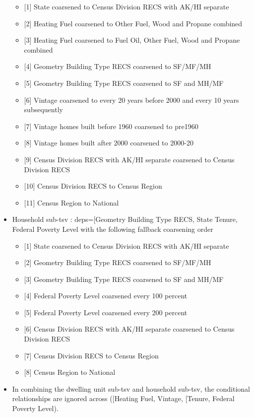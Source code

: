 \begin{itemize}
\begin{itemize}
  \item
    {[}1{]} State coarsened to Census Division RECS with AK/HI separate
  \item
    {[}2{]} Heating Fuel coarsened to Other Fuel, Wood and Propane
    combined
  \item
    {[}3{]} Heating Fuel coarsened to Fuel Oil, Other Fuel, Wood and
    Propane combined
  \item
    {[}4{]} Geometry Building Type RECS coarsened to SF/MF/MH
  \item
    {[}5{]} Geometry Building Type RECS coarsened to SF and MH/MF
  \item
    {[}6{]} Vintage coarsened to every 20 years before 2000 and every 10
    years subsequently
  \item
    {[}7{]} Vintage homes built before 1960 coarsened to pre1960
  \item
    {[}8{]} Vintage homes built after 2000 coarsened to 2000-20
  \item
    {[}9{]} Census Division RECS with AK/HI separate coarsened to Census
    Division RECS
  \item
    {[}10{]} Census Division RECS to Census Region
  \item
    {[}11{]} Census Region to National
  \end{itemize}
\item
  Household sub-tsv : deps={[}\textquotesingle Geometry Building Type
  RECS\textquotesingle, \textquotesingle State\textquotesingle{}
  \textquotesingle Tenure\textquotesingle, \textquotesingle Federal
  Poverty Level\textquotesingle{]} with the following fallback
  coarsening order

  \begin{itemize}
   
  \item
    {[}1{]} State coarsened to Census Division RECS with AK/HI separate
  \item
    {[}2{]} Geometry Building Type RECS coarsened to SF/MF/MH
  \item
    {[}3{]} Geometry Building Type RECS coarsened to SF and MH/MF
  \item
    {[}4{]} Federal Poverty Level coarsened every 100 percent
  \item
    {[}5{]} Federal Poverty Level coarsened every 200 percent
  \item
    {[}6{]} Census Division RECS with AK/HI separate coarsened to Census
    Division RECS
  \item
    {[}7{]} Census Division RECS to Census Region
  \item
    {[}8{]} Census Region to National
  \end{itemize}
\item
  In combining the dwelling unit sub-tsv and household sub-tsv, the
  conditional relationships are ignored across
  ({[}\textquotesingle Heating Fuel\textquotesingle,
  \textquotesingle Vintage\textquotesingle{]},
  {[}\textquotesingle Tenure\textquotesingle, \textquotesingle Federal
  Poverty Level\textquotesingle{]}).
\end{itemize}

